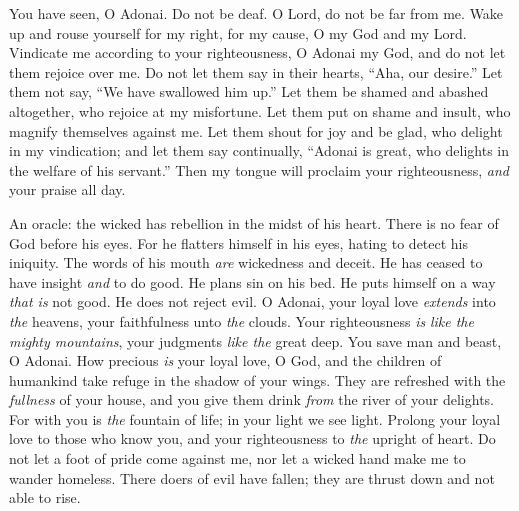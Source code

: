 \begin{biblechapter}
\verse You have seen, O Adonai. Do not be deaf. 
O Lord, do not be far from me.
\verse Wake up and rouse yourself for my right, 
for my cause, O my God and my Lord.
\verse Vindicate me according to your righteousness, 
O Adonai my God, 
and do not let them rejoice over me.
\verse Do not let them say in their hearts, “Aha, our desire.” 
Let them not say, “We have swallowed him up.”
\verse Let them be shamed and abashed altogether, 
who rejoice at my misfortune. 
Let them put on shame and insult, 
who magnify themselves against me.
\verse Let them shout for joy and be glad, 
who delight in my vindication; 
and let them say continually, “Adonai is great, 
who delights in the welfare of his servant.”
\verse Then my tongue will proclaim your righteousness, 
\textit{and} your praise all day.
\end{biblechapter}

\begin{biblechapter} %
 An oracle: the wicked has rebellion 
in the midst of his heart. 
There is no fear of God before his eyes.
\verse For he flatters himself in his eyes, 
hating to detect his iniquity.
\verse The words of his mouth \textit{are} wickedness and deceit. 
He has ceased to have insight \textit{and} to do good.
\verse He plans sin on his bed. 
He puts himself on a way \textit{that is} not good. 
He does not reject evil.
\verse O Adonai, your loyal love \textit{extends} into \textit{the} heavens, 
your faithfulness unto \textit{the} clouds.
\verse Your righteousness \textit{is} \textit{like the mighty mountains}, 
your judgments \textit{like the} great deep. 
You save man and beast, O Adonai.
\verse How precious \textit{is} your loyal love, O God, 
and the children of humankind 
take refuge in the shadow of your wings.
\verse They are refreshed with the \textit{fullness} of your house, 
and you give them drink \textit{from} the river of your delights.
\verse For with you is \textit{the} fountain of life; 
in your light we see light.
\verse Prolong your loyal love to those who know you, 
and your righteousness to \textit{the} upright of heart.
\verse Do not let a foot of pride come against me, 
nor let a wicked hand make me to wander homeless.
\verse There doers of evil have fallen; 
they are thrust down and not able to rise.
\end{biblechapter}

